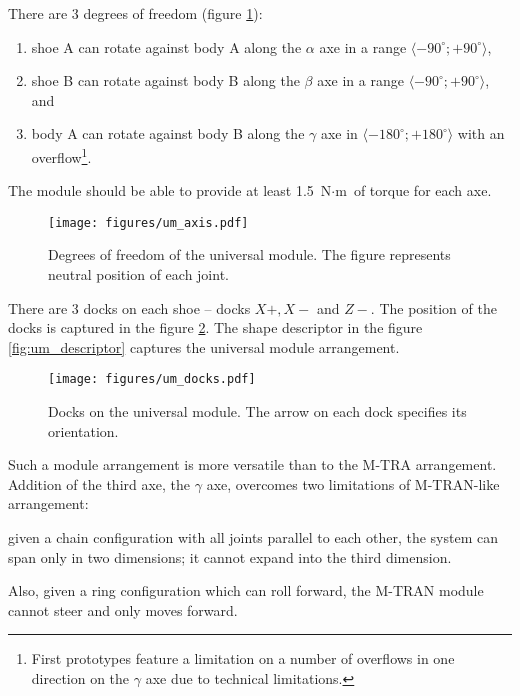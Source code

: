 There are 3 degrees of freedom (figure \ref{fig:um_axis}):
\begin{enumerate}
    \item shoe A can rotate against body A along the $\alpha$ axe in a range
    $\langle -90^\circ; +90^\circ\rangle$,
    \item shoe B can rotate against body B along the $\beta$ axe in a range
    $\langle -90^\circ; +90^\circ\rangle$, and
    \item body A can rotate against body B along the $\gamma$ axe in $\langle
    -180^\circ; +180^\circ\rangle$ with an overflow\footnote{First prototypes
    feature a limitation on a number of overflows in one direction on the
    $\gamma$ axe due to technical limitations. }.
\end{enumerate}
The module should be able to provide at least 1.5 $\text{N}\cdot\text{m}$ of
torque for each axe.

\begin{figure}
    \centering
    \texttt{[image: figures/um\_axis.pdf]}
    \caption{Degrees of freedom of the universal module. The figure represents neutral position of each joint.}
    \label{fig:um_axis}
\end{figure}

There are 3 docks on each shoe -- docks $X+, X-$ and $Z-$. The position of the
docks is captured in the figure \ref{fig:um_docks}. The shape descriptor in the
figure \ref{fig:um_descriptor} captures the universal module arrangement.

\begin{figure}
    \centering
    \texttt{[image: figures/um\_docks.pdf]}
    \caption{Docks on the universal module. The arrow on each dock specifies its orientation.}
    \label{fig:um_docks}
\end{figure}

Such a module arrangement is more versatile than to the M-TRA arrangement.
Addition of the third axe, the $\gamma$ axe, overcomes two limitations of
M-TRAN-like arrangement:
\begin{enumerate*}
    \item given a chain configuration with all joints parallel to each other,
    the system can span only in two dimensions; it cannot expand into the third
    dimension.
    \item Also, given a ring configuration which can roll forward, the M-TRAN
    module cannot steer and only moves forward.
\end{enumerate*}


